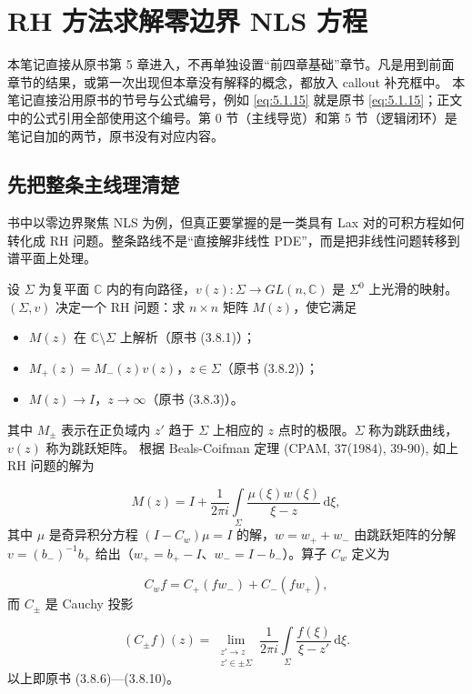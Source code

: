 \documentclass[
    lang=cn,
    scheme=chinese,
    mode=simple,
    device=normal,
    color=blue,
    math=cm,
    thmcnt=section,
    12pt,
    nowatermark
]{elegantbook}
\begin{document}
\setcounter{chapter}{4}

\chapter{RH 方法求解零边界 NLS 方程}

\begin{callout}[编号说明]
    本笔记直接从原书第 5 章进入，不再单独设置``前四章基础''章节。凡是用到前面章节的结果，或第一次出现但本章没有解释的概念，都放入 callout 补充框中。
    本笔记直接沿用原书的节号与公式编号，例如 \eqref{eq:5.1.15} 就是原书 \eqref{eq:5.1.15}；正文中的公式引用全部使用这个编号。第 0 节（主线导览）和第 5 节（逻辑闭环）是笔记自加的两节，原书没有对应内容。
\end{callout}

\section*{先把整条主线理清楚}

书中以零边界聚焦 NLS 为例，但真正要掌握的是一类具有 Lax 对的可积方程如何转化成 RH 问题。整条路线不是``直接解非线性 PDE''，而是把非线性问题转移到谱平面上处理。

\begin{callout}
    设 $\Sigma$ 为复平面 $\mathbb{C}$ 内的有向路径，$v(z):\Sigma\to GL(n,\mathbb{C})$ 是 $\Sigma^0$ 上光滑的映射。
    $(\Sigma,v)$ 决定一个 RH 问题：求 $n\times n$ 矩阵 $M(z)$，使它满足

    \begin{itemize}
        \item $M(z)$ 在 $\mathbb{C}\setminus\Sigma$ 上解析（原书 (3.8.1)）；
        \item $M_+(z)=M_-(z)v(z)$，$z\in\Sigma$（原书 (3.8.2)）；
        \item $M(z)\to I$，$z\to\infty$（原书 (3.8.3)）。
    \end{itemize}

    其中 $M_\pm$ 表示在正负域内 $z'$ 趋于 $\Sigma$ 上相应的 $z$ 点时的极限。$\Sigma$ 称为跳跃曲线，$v(z)$ 称为跳跃矩阵。
    根据 Beals-Coifman 定理 (CPAM, 37(1984), 39-90), 如上 RH 问题的解为

    \[
        M(z)
        =
        I+\dfrac{1}{2\pi i}\int\limits_\Sigma\dfrac{\mu(\xi)w(\xi)}{\xi-z}\,\mathrm d\xi,
    \]
    其中 $\mu$ 是奇异积分方程 $(I-C_w)\mu=I$ 的解，$w=w_++w_-$ 由跳跃矩阵的分解 $v=(b_-)^{-1}b_+$ 给出（$w_+=b_+-I$、$w_-=I-b_-$）。算子 $C_w$ 定义为

    \[
        C_wf=C_+(fw_-)+C_-(fw_+),
    \]
    而 $C_\pm$ 是 Cauchy 投影

    \[
        (C_\pm f)(z)=\lim\limits_{\substack{z'\to z\\ z'\in\pm\Sigma}}\dfrac{1}{2\pi i}\int\limits_\Sigma\dfrac{f(\xi)}{\xi-z'}\,\mathrm d\xi.
    \]
    以上即原书 (3.8.6)---(3.8.10)。
\end{callout}
\end{document}
